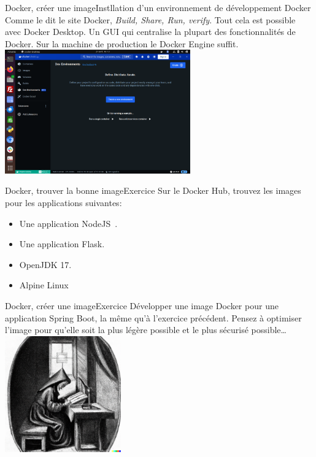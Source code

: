 \documentclass{beamer}
\begin{document}
    \begin{frame}{Docker, créer une image}{Instllation d'un environnement de développement Docker}
        Comme le dit le site Docker, \textit{Build, Share, Run, verify}.
        Tout cela est possible avec Docker Desktop.
        Un GUI qui centralise la plupart des fonctionnalités de Docker.
        \bigbreak
        Sur la machine de production le Docker Engine suffit.
        \bigbreak
        \centering
        \includegraphics[width=8cm]{image/docker-desktop}
    \end{frame}

    \begin{frame}{Docker, trouver la bonne image}{Exercice \execcounterdispinc{}}
        Sur le Docker Hub, trouvez les images pour les applications suivantes:
        \begin{itemize}
            \item Une application NodeJS~.
            \item Une application Flask.
            \item OpenJDK 17.
            \item Alpine Linux
        \end{itemize}
    \end{frame}

    \begin{frame}{Docker, créer une image}{Exercice \execcounterdispinc{}}
        Développer une image Docker pour une application Spring Boot, la même qu'à l'exercice précédent.
        \bigbreak
        Pensez à optimiser l'image pour qu'elle soit la plus légère possible et le plus sécurisé possible\ldots
        \bigbreak
        \centering
        \includegraphics[width=5cm]{image/young-studying}
    \end{frame}
\end{document}
